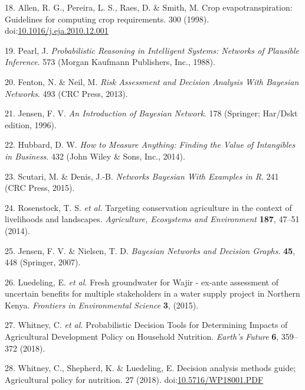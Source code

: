 \documentclass[12pt,oneside]{article}
\begin{document}
\leavevmode\hypertarget{ref-Allen_et_al_1998}{}%
18. Allen, R. G., Pereira, L. S., Raes, D. \& Smith, M. Crop evapotranspiration: Guidelines for computing crop requirements. 300 (1998). doi:\href{https://doi.org/10.1016/j.eja.2010.12.001}{10.1016/j.eja.2010.12.001}

\leavevmode\hypertarget{ref-Pearl_1988}{}%
19. Pearl, J. \emph{Probabilistic Reasoning in Intelligent Systems: Networks of Plausible Inference}. 573 (Morgan Kaufmann Publishers, Inc., 1988).

\leavevmode\hypertarget{ref-Fenton_and_Neil_2013}{}%
20. Fenton, N. \& Neil, M. \emph{Risk Assessment and Decision Analysis With Bayesian Networks}. 493 (CRC Press, 2013).

\leavevmode\hypertarget{ref-Jensen_1996}{}%
21. Jensen, F. V. \emph{An Introduction of Bayesian Network}. 178 (Springer; Har/Dskt edition, 1996).

\leavevmode\hypertarget{ref-Hubbard_2014}{}%
22. Hubbard, D. W. \emph{How to Measure Anything: Finding the Value of Intangibles in Business}. 432 (John Wiley \& Sons, Inc., 2014).

\leavevmode\hypertarget{ref-Scutari_and_Denis_2015}{}%
23. Scutari, M. \& Denis, J.-B. \emph{Networks Bayesian With Examples in R}. 241 (CRC Press, 2015).

\leavevmode\hypertarget{ref-Rosenstock_et_al_2014}{}%
24. Rosenstock, T. S. \emph{et al.} Targeting conservation agriculture in the context of livelihoods and landscapes. \emph{Agriculture, Ecosystems and Environment} \textbf{187}, 47--51 (2014).

\leavevmode\hypertarget{ref-Jensen_and_Nielsen_2007}{}%
25. Jensen, F. V. \& Nielsen, T. D. \emph{Bayesian Networks and Decision Graphs}. \textbf{45}, 448 (Springer, 2007).

\leavevmode\hypertarget{ref-Luedeling_et_al_2015}{}%
26. Luedeling, E. \emph{et al.} Fresh groundwater for Wajir - ex-ante assessment of uncertain benefits for multiple stakeholders in a water supply project in Northern Kenya. \emph{Frontiers in Environmental Science} \textbf{3}, (2015).

\leavevmode\hypertarget{ref-Whitney_et_al_2018}{}%
27. Whitney, C. \emph{et al.} Probabilistic Decision Tools for Determining Impacts of Agricultural Development Policy on Household Nutrition. \emph{Earth's Future} \textbf{6}, 359--372 (2018).

\leavevmode\hypertarget{ref-Whitney_et_al_2018a}{}%
28. Whitney, C., Shepherd, K. \& Luedeling, E. Decision analysis methods guide; Agricultural policy for nutrition. 27 (2018). doi:\href{https://doi.org/10.5716/WP18001.PDF}{10.5716/WP18001.PDF}
\end{document}
